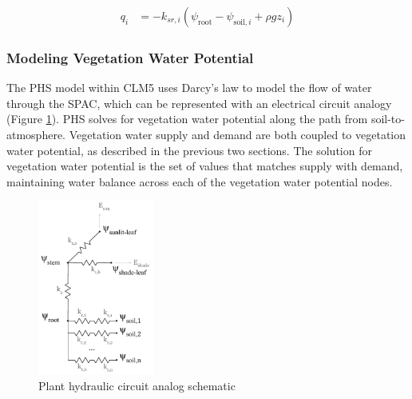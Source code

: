 \documentclass[draft,linenumbers]{agujournal}
\begin{document}
    \begin{linenomath*}
    \begin{equation}
        \begin{aligned}
    q_i &= -k_{sr,i}  \left(\psi_{\text{root}}-\psi_{\text{soil},i}+\rho g z_i\right)
    \label{phs:sink}
    \end{aligned}
    \end{equation}
    \end{linenomath*}

\subsubsection{Modeling Vegetation Water Potential}
\label{sect:vwp}
  The PHS model within CLM5 uses Darcy's law to model the flow of water through the SPAC, which can be represented with an electrical circuit analogy (Figure \ref{circuit}).
  PHS solves for vegetation water potential along the path from soil-to-atmosphere.
  Vegetation water supply and demand are both coupled to vegetation water potential, as described in the previous two sections.
  The solution for vegetation water potential is the set of values that matches supply with demand, maintaining water balance across each of the vegetation water potential nodes.

  \begin{figure}[h]
     \centering
     \includegraphics[width=9pc]{figs/circuit.pdf}
     \caption{Plant hydraulic circuit analog schematic}
     \label{circuit}
  \end{figure}
\end{document}
